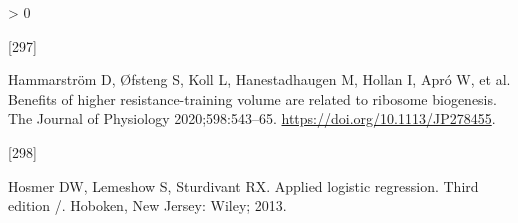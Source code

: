 \documentclass[twoside,10pt]{gihclass} %
\newlength{\cslhangindent}
\newlength{\csllabelwidth}
\newenvironment{CSLReferences}[3] %
 {%
  \setlength{\parindent}{0pt}
  \ifodd #1 \everypar{\setlength{\hangindent}{\cslhangindent}}\ignorespaces\fi
  \ifnum #2 > 0
  \setlength{\parskip}{#2\baselineskip}
  \fi
 }%
 {}
\newcommand{\CSLLeftMargin}[1]{\parbox[t]{\maxof{\widthof{#1}}{\csllabelwidth}}{#1}}
\newcommand{\CSLRightInline}[1]{\parbox[t]{\linewidth}{#1}}
\begin{document}
\begin{CSLReferences}{0}{0}
\leavevmode\hypertarget{ref-RN2358}{}%
\CSLLeftMargin{{[}297{]} }
\CSLRightInline{Hammarström D, Øfsteng S, Koll L, Hanestadhaugen M, Hollan I, Apró W, et al. Benefits of higher resistance-training volume are related to ribosome biogenesis. The Journal of Physiology 2020;598:543--65. \url{https://doi.org/10.1113/JP278455}.}

\leavevmode\hypertarget{ref-RN1998}{}%
\CSLLeftMargin{{[}298{]} }
\CSLRightInline{Hosmer DW, Lemeshow S, Sturdivant RX. Applied logistic regression. Third edition /. Hoboken, New Jersey: Wiley; 2013.}

\end{CSLReferences}

\end{document}
